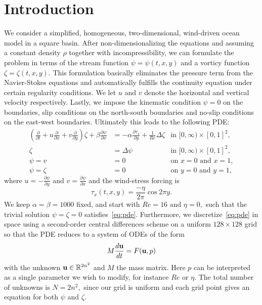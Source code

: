 \section{Introduction}
We consider a simplified, homogeneous, two-dimensional, wind-driven ocean model in a square basin. After non-dimensionalizing the equations and assuming a constant density $\rho$ together with incompressibility, we can formulate the problem in terms of the stream function $\psi = \psi(t, x, y)$ and a vorticy function $\zeta = \zeta(t, x, y).$ This formulation basically eliminates the pressure term from the Navier-Stokes equations and automatically fulfills the continuity equation under certain regularity conditions. We let $u$ and $v$ denote the horizontal and vertical velocity respectively. Lastly, we impose the kinematic condition $\psi = 0$ on the boundaries, slip conditions on the north-south boundaries and no-slip conditions on the east-west boundaries. Ultimately this leads to the following PDE:
\begin{equation}\label{eq:pde}
\begin{aligned}
  \left(\frac{\partial}{\partial t} + u \frac{\partial}{\partial x} + v \frac{\partial}{\partial y}\right) \zeta + \beta \frac{\partial \psi}{\partial x} &= -\alpha \frac{\partial \tau_x}{\partial y} + \frac{1}{Re} \Delta \zeta & \text{in } [0, \infty) \times [0,1]^2, \\
  \zeta &= \Delta \psi & \text{in } [0, \infty) \times [0,1]^2, \\
  \psi = v &= 0 & \text{on } x = 0 \text{ and } x = 1, \\
  \psi = \zeta &= 0 & \text{on } y = 0 \text{ and } y = 1,
\end{aligned}
\end{equation}
where $u = -\frac{\partial \psi}{\partial y}$ and $v = \frac{\partial \psi}{\partial x}$ and the wind-stress forcing is
\begin{equation}
  \tau_x(t, x, y) = \frac{- \eta}{2 \pi} \cos{2\pi y}.
 \label{eq:tau}
\end{equation}
We keep $\alpha = \beta = 1000$ fixed, and start with $Re = 16$ and $\eta = 0,$ such that the trivial solution $\psi = \zeta = 0$ satisfies~\eqref{eq:pde}. Furthermore, we discretize~\eqref{eq:pde} in space using a second-order central differences scheme on a uniform $128\times128$ grid so that the PDE reduces to a system of ODEs of the form
\begin{equation}\label{eq:ode}
  M \frac{d \mathbf{u}}{d t} = F(\mathbf{u}, p)
\end{equation}
with the unknown $\mathbf{u} \in \mathbb{R}^{2n^2}$ and $M$ the mass matrix. Here $p$ can be interpreted as a single parameter we wish to modify, for instance $Re$ or $\eta.$ The total number of unknowns is $N = 2 n^2,$ since our grid is uniform and each grid point gives an equation for both $\psi$ and $\zeta.$


